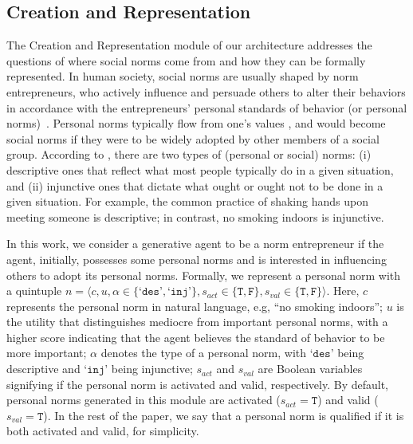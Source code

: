 \documentclass{article}
\begin{document}
\subsection{Creation and Representation}
\label{subsec: creation}
The Creation and Representation module of our architecture addresses the questions of where social norms come from and how they can be formally represented.
In human society, social norms are usually shaped by norm entrepreneurs, who actively influence and persuade others to alter their behaviors in accordance with the entrepreneurs' personal standards of behavior (or personal norms)~\cite{sunstein1996social}. Personal norms typically flow from one’s values \cite{schwartz1973normative}, and would become social norms if they were to be widely adopted by other members of a social group. According to \cite{cialdini1991focus}, there are two types of (personal or social) norms: (i) descriptive ones that reflect what most people typically do in a given situation, and (ii) injunctive ones that dictate what ought or ought not to be done in a given situation. 
For example, the common practice of shaking hands upon meeting someone is descriptive;
in contrast, no smoking indoors is injunctive.  

In this work, we consider a generative agent to be a norm entrepreneur if the agent, initially, possesses some personal norms and is interested in influencing others to adopt its personal norms. Formally, we represent a personal norm with a quintuple $n =\langle c, u, \alpha\in \{\texttt{`des'}, \texttt{`inj'}\}, s_{act}\in\{\texttt{T}, \texttt{F}\}, s_{val} \in \{\texttt{T}, \texttt{F}\} \rangle$.
Here, $c$ represents the personal norm in natural language, e.g, ``no smoking indoors'';  $u$ is the utility that distinguishes mediocre from important personal norms, with a higher score indicating that the agent believes the standard of behavior to be more important; $\alpha$ denotes the type of a personal norm, with $\texttt{`des'}$ being descriptive  and $\texttt{`inj'}$ being injunctive; $s_{act}$ and $s_{val}$ are Boolean variables signifying if the personal norm is activated and valid, respectively. 
By default, personal norms generated in this module are activated ($s_{act}=\texttt{T}$) and valid ($s_{val}=\texttt{T}$). In the rest of the paper, we say that a personal norm is qualified if it is both activated and valid, for simplicity. 
\end{document}
